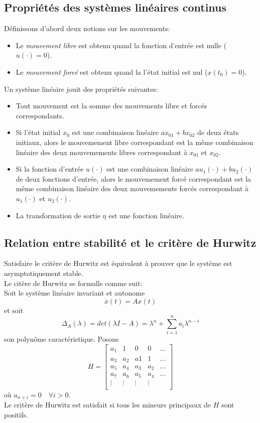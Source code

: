 \documentclass[a4paper]{article}
\begin{document}
\subsection{Propriétés des systèmes linéaires continus}
Définissons d'abord deux notions sur les mouvements:
\begin{itemize}
	\item Le \emph{mouvement libre} est obtenu quand la fonction d'entrée est
		nulle ($u(\cdot)=0$).
	\item Le \emph{mouvement forcé} est obtenu quand la l'état initial est nul
		($x(t_0)=0$).
\end{itemize}
Un système linéaire jouit des propriétés suivantes:
\begin{itemize}
	\item Tout mouvement est la somme des mouvements libre et forcés
		correspondants.
	\item Si l'état initial $x_0$ est une combinaison linéaire
		$ax_{01} + bx_{02}$ de deux états initiaux, alors le mouvemement libre
		correspondant est la même combinaison linéaire des deux mouvemements
		libres correspondant à $x_{01}$ et $x_{02}$.
	\item Si la fonction d'entrée $u(\cdot)$ est une combinaison linéaire
		$au_1(\cdot) + bu_2(\cdot)$ de deux fonctions d'entrée, alors le
		mouvemement forcé correspondant est la même combinaison linéaire des
		deux mouvemements forcés correspondant à $u_1(\cdot)$ et $u_2(\cdot)$.
	\item La transformation de sortie $\eta$ est une fonction linéaire.
\end{itemize}
\subsection{Relation entre stabilité et le critère de Hurwitz}
Satisfaire le critère de Hurwitz est équivalent à prouver que le système
est asymptotiquement stable.\\
Le citère de Hurwitz se formulle comme suit:\\
Soit le système linéaire invariant et autonome
\[\dot x(t)=Ax(t)\]
et soit
\[\Delta_A(\lambda)=det(\lambda I - A)
= \lambda^n+\sum_{i=1}^na_i\lambda^{n-i}\]
son polynôme caractéristique. Posons
\[H=\begin{bmatrix}
	a_1 & 1 & 0 & 0 & \dots \\
	a_3 & a_2 & a1 & 1 & \dots \\
	a_5 & a_4 & a_3 & a_2 & \dots \\
	a_7 & a_6 & a_5 & a_4 & \dots \\
	\vdots & \vdots & \vdots & \vdots & \\
\end{bmatrix}
\]
où $a_{n+i} = 0\quad\forall i > 0$.\\
Le critère de Hurwitz est satisfait si tous les mineurs principaux de $H$ sont
positifs.
\end{document}
